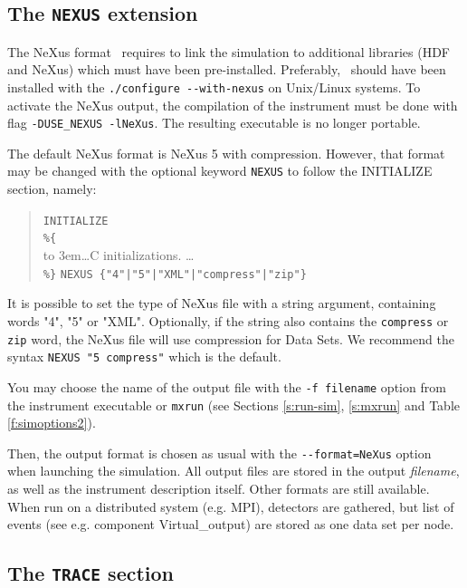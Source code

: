 \subsection{The \texttt{NEXUS} extension}
   
\label{s:nexus}

The NeXus format~\cite{nexus_webpage} requires to link the simulation to additional libraries (HDF and NeXus) which must have been pre-installed. Preferably, \MCX\ should have been installed with the \verb+./configure --with-nexus+ on Unix/Linux systems. To activate the NeXus output, the compilation of the instrument must be done with flag \verb+-DUSE_NEXUS -lNeXus+. The resulting executable is no longer portable.

The default NeXus format is NeXus 5 with compression. However, that format may be changed with the optional keyword \verb+NEXUS+ to follow the INITIALIZE section, namely:

\begin{quote}
  \texttt{INITIALIZE} \\
  \verb|%{| \\
  \hbox to 3em{}\ldots C initializations. \ldots \\
  \verb|%}|
  \verb+NEXUS {"4"|"5"|"XML"|"compress"|"zip"}+
\end{quote}

It is possible to set the type of NeXus file with a string argument, containing words "4", "5" or "XML". Optionally, if the string also contains the \verb+compress+ or \verb+zip+ word, the NeXus file will use compression for Data Sets. We recommend the syntax \verb+NEXUS "5 compress"+ which is the default.

You may choose the name of the output file with the \verb+-f filename+ option from the instrument executable or \verb+mxrun+ (see Sections \ref{s:run-sim}, \ref{s:mxrun} and Table \ref{f:simoptions2}).

Then, the output format is chosen as usual with the \verb+--format=NeXus+ option when launching the simulation. All output files are stored in the output \textit{filename}, as well as the instrument description itself. Other formats are still available. When run on a distributed system (e.g. MPI), detectors are gathered, but list of events (see e.g. component Virtual\_output) are stored as one data set per node.

\subsection{The \texttt{TRACE} section}
\label{s:trace}


